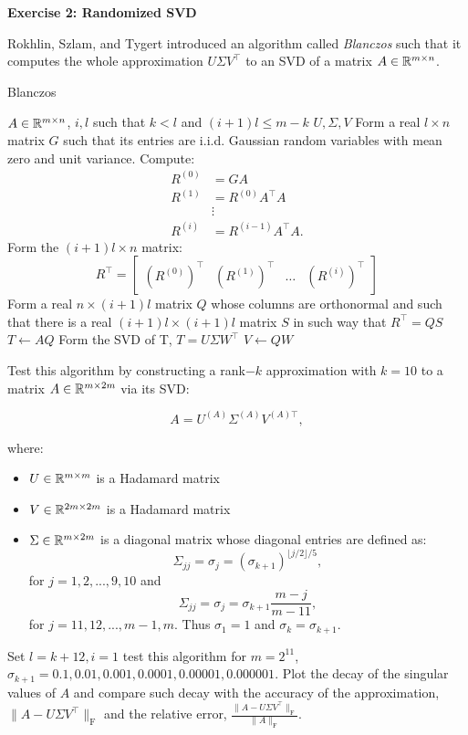 \documentclass[11pt]{article}
\begin{document}
\bigskip

{\bf{Exercise 2: Randomized SVD}}

Rokhlin, Szlam, and Tygert introduced an algorithm called \textit{Blanczos} such that it computes the whole approximation $U \Sigma V^\top$ to an SVD of a matrix $A \in \mathbb{R}^{m \times n}$.

\scriptsize
\begin{algorithm}
\caption{Blanczos}\label{Blanczos}
\begin{algorithmic}
\Input $A \in \mathbb{R}^{m \times n}$, $i, l$ such that $k < l$ and $(i+1)l \leq m-k$
\Output $U, \Sigma, V$
\State Form a real $l \times n$ matrix $G$ such that its entries are i.i.d. Gaussian random variables with mean zero and unit variance. Compute:
\begin{equation*}
    \begin{split}
        R^{(0)} & = GA \\
        R^{(1)} & = R^{(0)} A^\top A \\
        & \vdots \\
        R^{(i)} & = R^{(i-1)} A^\top A.
    \end{split}
\end{equation*}
\State Form the $(i + 1)l \times n$ matrix:
\[ R^\top = \begin{bmatrix} (R^{(0)})^\top & (R^{(1)})^\top & \hdots & (R^{(i)})^\top \end{bmatrix} \]
\State Form a real $n \times (i+1)l$ matrix $Q$ whose columns are orthonormal and such that there is a real $(i+1)l \times (i+1)l$ matrix $S$ in such way that $R^\top = QS$
\State $T \gets AQ$
\State Form the SVD of T, $T = U \Sigma W^\top$
\State $V \gets QW$
\end{algorithmic}
\end{algorithm}
\normalsize

Test this algorithm by constructing a rank$-k$ approximation with $k = 10$ to a matrix $A \in \mathbb{R}^{m \times 2m}$ via its SVD:

\[ A = U^{(A)} \Sigma^{(A)} V^{(A)\top}, \]

where:

\begin{itemize}
    \item $U \in \mathbb{R}^{m \times m}$ is a Hadamard matrix
    \item $V \in \mathbb{R}^{2m \times 2m}$ is a Hadamard matrix
    \item $\Sigma \in \mathbb{R}^{m \times 2m}$ is a diagonal matrix whose diagonal entries are defined as:
    \[ \Sigma_{jj} = \sigma_j = (\sigma_{k+1})^{\lfloor j/2 \rfloor / 5}, \]
    for $j = 1, 2, ..., 9, 10$ and
    \[ \Sigma_{jj} = \sigma_j = \sigma_{k+1} \frac{m-j}{m-11}, \]
    for $j = 11, 12, ..., m-1, m$. Thus $\sigma_1 = 1$ and $\sigma_k = \sigma_{k+1}$.
\end{itemize}

Set $l = k+12, i = 1$ test this algorithm for $m = 2^{11}$, $\sigma_{k+1} = 0.1, 0.01, 0.001, 0.0001, 0.00001, 0.000001$. Plot the decay of the singular values of $A$ and compare such decay with the accuracy of the approximation, $\| A - U \Sigma V^\top\|_{\text{F}}$ and the relative error, $\frac{\| A - U \Sigma V^\top\|_{\text{F}}}{\|A\|_{\text{F}}}$.



\end{document}
